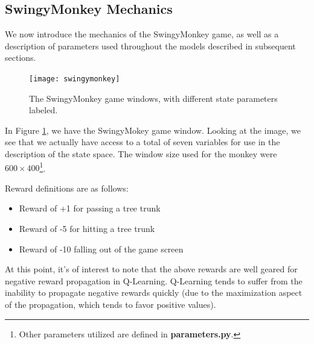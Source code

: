 \documentclass[letterpaper]{article}
\begin{document}
\subsection{SwingyMonkey Mechanics}
We now introduce the mechanics of the SwingyMonkey game, as well as a description of parameters used throughout the models described in subsequent sections. 

\begin{figure}
\centering
\texttt{[image: swingymonkey]}
\caption{The SwingyMonkey game windows, with different state parameters labeled.}
\label{fig:swingymonkey}
\end{figure}

In Figure \ref{fig:swingymonkey}, we have the SwingyMokey game window. Looking at the image, we see that we actually have access to a total of seven variables for use in the description of the state space. The window size used for the monkey were $600 \times 400$\footnote{Other parameters utilized are defined in \textbf{parameters.py}.}.

Reward definitions are as follows:
\begin{itemize}
\item Reward of +1 for passing a tree trunk
\item Reward of -5 for hitting a tree trunk
\item Reward of -10 falling out of the game screen
\end{itemize}
At this point, it's of interest to note that the above rewards are well geared for negative reward propagation in Q-Learning. Q-Learning tends to suffer from the inability to propagate negative rewards quickly (due to the maximization aspect of the propagation, which tends to favor positive values). \\
\end{document}
